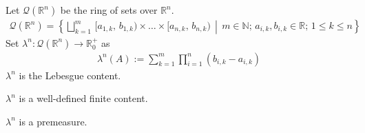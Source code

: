 \begin{definition}
    Let \(\mathcal{Q}(\mathbb{R}^n)\) be the ring of sets over \(\mathbb{R}^n\). %
    \begin{align}
        \mathcal{Q}(\mathbb{R}^n) = \left\{ \bigsqcup_{k=1}^m \, [a_{1, k},\, b_{1, k}) \times \dots \times [a_{n, k},\, b_{n, k}) \, \middle| \, m \in \mathbb{N}; \, a_{i, k}, b_{i, k} \in \mathbb{R}; \, 1 \leq k \leq n \right\}
    \end{align}
    Set \(\lambda^n: \mathcal{Q}(\mathbb{R}^n) \rightarrow \mathbb{R}_0^+\) as
    \begin{align}
        \lambda^n(A) := \sum_{k=1}^m \prod_{i=1}^n (b_{i,k} - a_{i, k})
    \end{align}
    \(\lambda^n\) is the Lebesgue content.
\end{definition}
\begin{theorem}
    \(\lambda^n\) is a well-defined finite content.
\end{theorem}
\begin{theorem}
    \(\lambda^n\) is a premeasure.
\end{theorem}